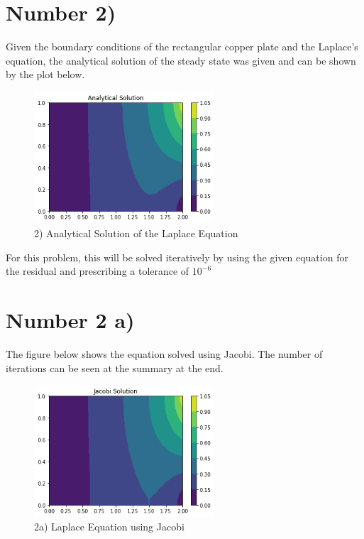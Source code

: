 \documentclass{article}
\begin{document}
	\section*{Number 2)}
		Given the boundary conditions of the rectangular copper plate and the Laplace's equation, the analytical solution of the steady state was given and can be shown by the plot below.
		
		\begin{figure}[H]
			\centering
			\includegraphics[width=0.6\textwidth]{images/anal.png}
			\caption{\label{} 2) Analytical Solution of the Laplace Equation }
		\end{figure}
	
		For this problem, this will be solved iteratively by using the given equation for the residual and prescribing a tolerance of $ 10^{-6}$
	
	\section*{Number 2 a)}
		The figure below shows the equation solved using Jacobi. The number of iterations can be seen at the summary at the end. 
		
		\begin{figure}[H]
			\centering
			\includegraphics[width=0.6\textwidth]{images/jaco.png}
			\caption{\label{} 2a) Laplace Equation using Jacobi }
		\end{figure}
	
\end{document}
